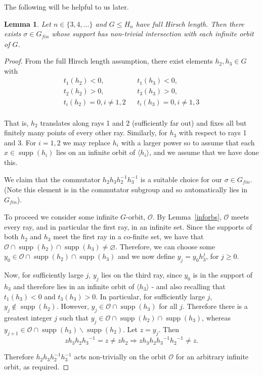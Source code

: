 \documentclass[11pt,a4paper]{amsart}
\renewcommand{\setminus}{\smallsetminus}
\renewcommand{\emptyset}{\varnothing}
\newtheorem{lemma}[theorem]{Lemma}
\theoremstyle{definition}
\theoremstyle{remark}
\newcommand{\supp}{\operatorname{supp}}
\renewcommand{\implies}{\Rightarrow}
\newcommand{\gfin}{G_{\textit{fin}}}
\begin{document}
The following will be helpful to us later.
\begin{lemma}\label{lem:finitaryonallorbits} Let $n\in \{3, 4, \ldots\}$ and $G\le H_n$ have full Hirsch length. Then there exists $\sigma\in \gfin$ whose support has non-trivial intersection with each infinite orbit of $G$.
\end{lemma}
\begin{proof}
	From the full Hirsch length assumption, there exist elements $h_2, h_3\in G$ with 
	$$
	\begin{array}{rcl}
		t_1(h_2) <0,  & & t_1(h_3) < 0, \\
		t_2(h_2) > 0, & & t_3(h_3) > 0, \\
		t_i(h_2) =0, i \neq 1,2  & & 	t_i(h_3) =0, i \neq 1,3 \\
	\end{array}
	$$ 
	
That is, $h_2$ translates along rays 1 and 2 (sufficiently far out) and fixes all but finitely many points of every other ray. Similarly, for $h_3$ with respect to rays 1 and 3. For $i=1, 2$ we may  replace $h_i$ with a larger power so to assume that each $x\in \supp(h_i)$ lies on an infinite orbit of $\langle h_i\rangle$, and we assume that we have done this.  


We claim that the commutator $h_2h_3h_2^{-1}h_3^{-1}$ is a suitable choice for our $\sigma\in \gfin$. (Note this element is in the commutator subgroup and so automatically lies in $\gfin$). 


	
	To proceed we consider some infinite $G$-orbit, $\mathcal{O}$. 
	By Lemma~\ref{inforbs}, $\mathcal{O}$ meets every ray, and in particular the first ray, in an infinite set. Since the supports of both $h_2$ and $h_3$ meet the first ray in a co-finite set, we have that $\mathcal{O} \cap \supp(h_2) \cap \supp(h_3) \neq \emptyset$. Therefore, we can choose some $y_0 \in \mathcal{O} \cap \supp(h_2) \cap \supp(h_3)$ and we now define $y_j = y_0 h_3^j$, for $j \geq 0$. 
	
	Now, for sufficiently large $j$, $y_j$ lies on the third ray, since $y_0$ is in the support of $h_3$ and therefore lies in an infinite orbit of $\langle h_3 \rangle$ - and also recalling that $t_1(h_3)<0$ and $t_3(h_3) > 0$. In particular, for sufficiently large $j$, $y_j \not\in \supp(h_2)$. However, $y_j \in \mathcal{O} \cap \supp(h_3)$ for all $j$. Therefore there is a greatest integer $j$ such that $y_j \in \mathcal{O} \cap \supp(h_2) \cap \supp(h_3)$, whereas $y_{j+1} \in \mathcal{O} \cap \supp(h_3) \setminus \supp(h_2)$. Let $z = y_j$. Then 
	$$
	z h_3 h_2 {h_3}^{-1} = z \neq z h_2 \implies z h_3 h_2 {h_3}^{-1} {h_2}^{-1} \neq z. 
	$$
	
	Therefore $h_2h_3h_2^{-1}h_3^{-1}$ acts non-trivially on the orbit $\mathcal{O}$ for an arbitrary infinite orbit, as required. 
\end{proof}
\end{document}
